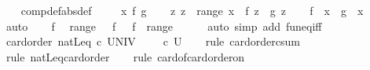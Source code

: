 \begin{isabellebody}
\ \ \isamarkupfalse%
\ comp{\isacharunderscore}{\kern0pt}def{\isacharbrackleft}{\kern0pt}abs{\isacharunderscore}{\kern0pt}def{\isacharbrackright}{\kern0pt}\ \isacommand{{\isachardot}{\kern0pt}{\isachardot}{\kern0pt}}\isamarkupfalse%
\isanewline
{}\isamarkupfalse%
\isanewline
\ \ \isamarkupfalse%
\ x\ f\ g\isanewline
\ \ \isamarkupfalse%
\ {\isachardoublequoteopen}{\isasymAnd}z{\isachardot}{\kern0pt}\ z\ {\isasymin}\ range\ x\ {\isasymLongrightarrow}\ f\ z\ {\isacharequal}{\kern0pt}\ g\ z{\isachardoublequoteclose}\isanewline
\ \ \isamarkupfalse%
\ {\isachardoublequoteopen}f\ {\isasymcirc}\ x\ {\isacharequal}{\kern0pt}\ g\ {\isasymcirc}\ x{\isachardoublequoteclose}\ \isamarkupfalse%
\ auto\isanewline
{}\isamarkupfalse%
\isanewline
\ \ \isamarkupfalse%
\ f\ \isamarkupfalse%
\ {\isachardoublequoteopen}range\ {\isasymcirc}\ {\isacharparenleft}{\kern0pt}{\isasymcirc}{\isacharparenright}{\kern0pt}\ f\ {\isacharequal}{\kern0pt}\ {\isacharparenleft}{\kern0pt}{\isacharbackquote}{\kern0pt}{\isacharparenright}{\kern0pt}\ f\ {\isasymcirc}\ range{\isachardoublequoteclose}\isanewline
\ \ \ \ \isamarkupfalse%
\ {\isacharparenleft}{\kern0pt}auto\ simp\ add{\isacharcolon}{\kern0pt}\ fun{\isacharunderscore}{\kern0pt}eq{\isacharunderscore}{\kern0pt}iff{\isacharparenright}{\kern0pt}\isanewline
{}\isamarkupfalse%
\isanewline
\ \ \isamarkupfalse%
\ {\isachardoublequoteopen}card{\isacharunderscore}{\kern0pt}order\ {\isacharparenleft}{\kern0pt}natLeq\ {\isacharplus}{\kern0pt}c\ {\isacharbar}{\kern0pt}UNIV{\isacharbar}{\kern0pt}\ {\isacharparenright}{\kern0pt}{\isachardoublequoteclose}\ {\isacharparenleft}{\kern0pt}\ {\isachardoublequoteopen}{\isacharunderscore}{\kern0pt}\ {\isacharparenleft}{\kern0pt}{\isacharunderscore}{\kern0pt}\ {\isacharplus}{\kern0pt}c\ {\isacharquery}{\kern0pt}U{\isacharparenright}{\kern0pt}{\isachardoublequoteclose}{\isacharparenright}{\kern0pt}\isanewline
\ \ \isamarkupfalse%
\ {\isacharparenleft}{\kern0pt}rule\ card{\isacharunderscore}{\kern0pt}order{\isacharunderscore}{\kern0pt}csum{\isacharparenright}{\kern0pt}\isanewline
\ \ \isamarkupfalse%
\ {\isacharparenleft}{\kern0pt}rule\ natLeq{\isacharunderscore}{\kern0pt}card{\isacharunderscore}{\kern0pt}order{\isacharparenright}{\kern0pt}\isanewline
\ \ \isamarkupfalse%
\ {\isacharparenleft}{\kern0pt}rule\ card{\isacharunderscore}{\kern0pt}of{\isacharunderscore}{\kern0pt}card{\isacharunderscore}{\kern0pt}order{\isacharunderscore}{\kern0pt}on{\isacharparenright}{\kern0pt}\isanewline

\end{isabellebody}
